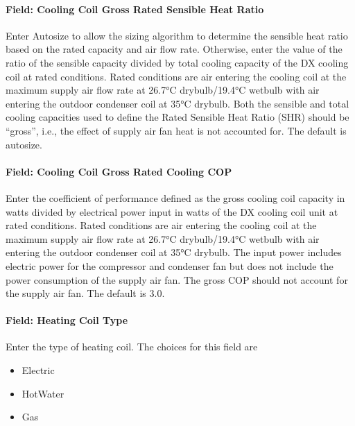 \paragraph{Field: Cooling Coil Gross Rated Sensible Heat Ratio}\label{field-cooling-coil-gross-rated-sensible-heat-ratio}

Enter Autosize to allow the sizing algorithm to determine the sensible heat ratio based on the rated capacity and air flow rate. Otherwise, enter the value of the ratio of the sensible capacity divided by total cooling capacity of the DX cooling coil at rated conditions. Rated conditions are air entering the cooling coil at the maximum supply air flow rate at 26.7°C drybulb/19.4°C wetbulb with air entering the outdoor condenser coil at 35°C drybulb. Both the sensible and total cooling capacities used to define the Rated Sensible Heat Ratio (SHR) should be ``gross'', i.e., the effect of supply air fan heat is not accounted for. The default is autosize.

\paragraph{Field: Cooling Coil Gross Rated Cooling COP}\label{field-cooling-coil-gross-rated-cooling-cop}

Enter the coefficient of performance defined as the gross cooling coil capacity in watts divided by electrical power input in watts of the DX cooling coil unit at rated conditions. Rated conditions are air entering the cooling coil at the maximum supply air flow rate at 26.7°C drybulb/19.4°C wetbulb with air entering the outdoor condenser coil at 35°C drybulb. The input power includes electric power for the compressor and condenser fan but does not include the power consumption of the supply air fan. The gross COP should not account for the supply air fan. The default is 3.0.

\paragraph{Field: Heating Coil Type}\label{field-heating-coil-type-1}

Enter the type of heating coil. The choices for this field are

\begin{itemize}
\item
  Electric
\item
  HotWater
\item
  Gas
\end{itemize}

